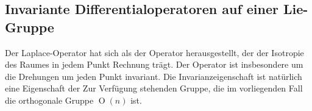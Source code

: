 %
%
\subsection{Invariante Differentialoperatoren auf einer Lie-Gruppe}
Der Laplace-Operator hat sich als der Operator herausgestellt, der
der Isotropie des Raumes in jedem Punkt Rechnung trägt.
Der Operator ist insbesondere um die Drehungen um jeden Punkt
invariant.
Die Invarianzeigenschaft ist natürlich eine Eigenschaft der 
Zur Verfügung stehenden Gruppe, die im vorliegenden Fall die
orthogonale Gruppe $\operatorname{O}(n)$ ist.







